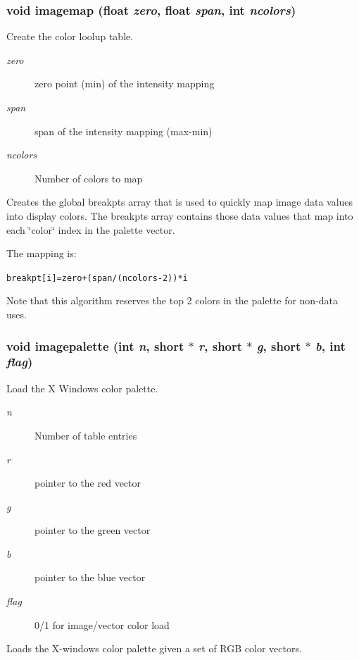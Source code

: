\subsubsection{\setlength{\rightskip}{0pt plus 5cm}void imagemap (float {\em zero}, float {\em span}, int {\em ncolors})}\label{xtv_8h_a66}


Create the color loolup table. 

\begin{Desc}
\item[Parameters:]
\begin{description}
\item[{\em zero}]zero point (min) of the intensity mapping \item[{\em span}]span of the intensity mapping (max-min) \item[{\em ncolors}]Number of colors to map\end{description}
\end{Desc}
Creates the global breakpts array that is used to quickly map image data values into display colors. The breakpts array contains those data values that map into each \char`\"{}color\char`\"{} index in the palette vector.

The mapping is: \small\begin{alltt}
  breakpt[i] = zero + (span/(ncolors-2)) * i
  \end{alltt}\normalsize 
 Note that this algorithm reserves the top 2 colors in the palette for non-data uses. 
\subsubsection{\setlength{\rightskip}{0pt plus 5cm}void imagepalette (int {\em n}, short $\ast$ {\em r}, short $\ast$ {\em g}, short $\ast$ {\em b}, int {\em flag})}\label{xtv_8h_a63}


Load the X Windows color palette. 

\begin{Desc}
\item[Parameters:]
\begin{description}
\item[{\em n}]Number of table entries \item[{\em r}]pointer to the red vector \item[{\em g}]pointer to the green vector \item[{\em b}]pointer to the blue vector \item[{\em flag}]0/1 for image/vector color load\end{description}
\end{Desc}
Loads the X-windows color palette given a set of RGB color vectors. 
